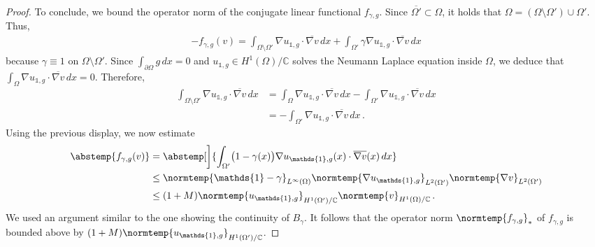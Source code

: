 \documentclass[pdflatex,sn-mathphys-num]{sn-jnl-preprint}
\newcommand{\C}{\mathbb{C}}
\newcommand{\norm}{\normtemp}
\newcommand{\abs}{\abstemp}
\newcommand{\diff}{d}
\newcommand{\dd}[1]{\,\diff{#1}}
\newcommand{\onebm}{\mathds{1}} %
\theoremstyle{thmstyleone}%
\theoremstyle{thmstyletwo}%
\theoremstyle{thmstylethree}%
\numberwithin{equation}{section}
\numberwithin{theorem}{section}
\begin{document}
\begin{appendices}
\begin{proof}
    To conclude, we bound the operator norm of the conjugate linear functional $f_{\gamma,g}$. Since $\overline{\Omega'}\subset \Omega$, it holds that $\Omega=(\Omega\setminus\Omega')\cup\Omega'$. Thus,
    \begin{align*}
        -f_{\gamma,g}(v)=\int_{\Omega\setminus\Omega'} \nabla u_{\onebm,g}\cdot \overline{\nabla v}\dd{x} + \int_{\Omega'}\gamma\nabla u_{\onebm,g}\cdot \overline{\nabla v}\dd{x}
    \end{align*}
    because $\gamma\equiv 1$ on $\Omega\setminus\Omega'$. Since $\int_{\partial\Omega}g\dd{x}=0$ and $ u_{\onebm,g}\in H^1(\Omega)/\C $ solves the Neumann Laplace equation inside $\Omega$, we deduce that $\int_{\Omega} \nabla u_{\onebm,g}\cdot \overline{\nabla v}\dd{x}=0$. Therefore,
    \begin{align*}
        \int_{\Omega\setminus\Omega'} \nabla u_{\onebm,g}\cdot \overline{\nabla v}\dd{x}&=
        \int_{\Omega} \nabla u_{\onebm,g}\cdot \overline{\nabla v}\dd{x}
        - \int_{\Omega'} \nabla u_{\onebm,g}\cdot \overline{\nabla v}\dd{x}\\
        &=-\int_{\Omega'} \nabla u_{\onebm,g}\cdot \overline{\nabla v}\dd{x}\,.
    \end{align*}
    Using the previous display, we now estimate
    \begin{align*}
        \abs{f_{\gamma,g}(v)}&=\abs[\bigg]{\int_{\Omega'} \bigl(1-\gamma(x)\bigr)\nabla u_{\onebm,g}(x)\cdot \overline{\nabla v}(x) \dd{x}}\\
        &\leq \norm{\onebm-\gamma}_{L^\infty(\Omega)}\norm{\nabla u_{\onebm,g}}_{L^2(\Omega')}\norm{\nabla v}_{L^2(\Omega')}\\
        &\leq (1+M)\norm{u_{\onebm,g}}_{H^1(\Omega')/\C}\norm{v}_{H^1(\Omega)/\C}\,.
    \end{align*}
    We used an argument similar to the one showing the continuity of $B_\gamma$. It follows that the operator norm $\norm{f_{\gamma,g}}_*$ of $f_{\gamma,g}$ is bounded above by $(1+M)\norm{u_{\onebm,g}}_{H^1(\Omega')/\C}$.
    

\end{proof}
\end{appendices}
\end{document}
